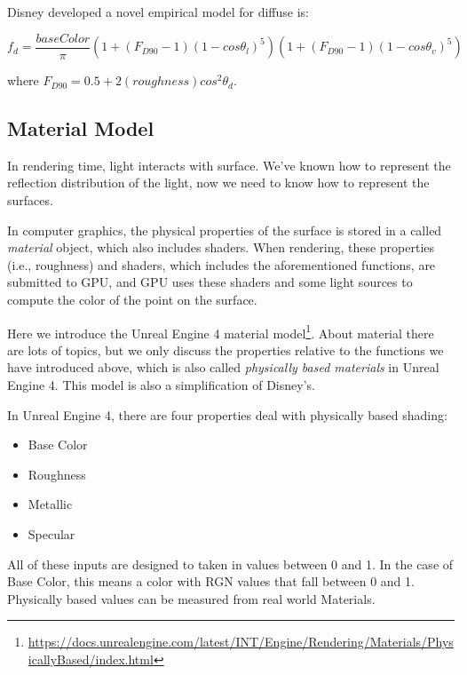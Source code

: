 Disney developed a novel empirical model\cite{a:PhysicallyBasedShadingatDisney} for diffuse is:

\begin{equation}
	f_d=\frac{baseColor}{\pi}(1+(F_{D90}-1)(1-cos\theta_l)^5)(1+(F_{D90}-1)(1-cos\theta_v)^5)
\end{equation} 

where $F_{D90}=0.5+2(roughness) cos^2\theta_d$.





\subsection{Material Model}
In rendering time, light interacts with surface. We've known how to represent the reflection distribution of the light, now we need to know how to represent the surfaces.

In computer graphics, the physical properties of the surface is stored in a called \textit{material} object, which also includes shaders. When rendering, these properties (i.e., roughness) and shaders, which includes the aforementioned functions, are submitted to GPU, and GPU uses these shaders and some light sources to compute the color of the point on the surface.

Here we introduce the Unreal Engine 4 material model\footnote{\url{https://docs.unrealengine.com/latest/INT/Engine/Rendering/Materials/PhysicallyBased/index.html}}. About material there are lots of topics, but we only discuss the properties relative to the functions we have introduced above, which is also called \textit{physically based materials} in Unreal Engine 4. This model is also a simplification of Disney's\cite{a:PhysicallyBasedShadingatDisney}.

In Unreal Engine 4, there are four properties deal with physically based shading:

\begin{itemize}
	\item Base Color
	\item Roughness
	\item Metallic
	\item Specular
\end{itemize}

All of these inputs are designed to taken in values between 0 and 1. In the case of Base Color, this means a color with RGN values that fall between 0 and 1. Physically based values can be measured from real world Materials.

